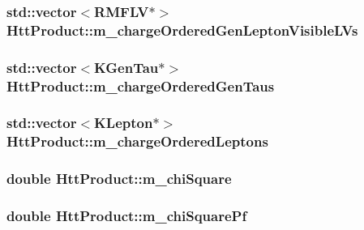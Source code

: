\label{classHttProduct_a70bf9c026bb6be12a25a0e793215511f}
\hypertarget{classHttProduct_a736650de11728388126970486f2f4417}{
\subsubsection[{m\_\-chargeOrderedGenLeptonVisibleLVs}]{\setlength{\rightskip}{0pt plus 5cm}std::vector$<$RMFLV$\ast$$>$ {\bf HttProduct::m\_\-chargeOrderedGenLeptonVisibleLVs}}}
\label{classHttProduct_a736650de11728388126970486f2f4417}
\hypertarget{classHttProduct_a7d32c5bc91b092a3a59af15a00ec6ec4}{
\subsubsection[{m\_\-chargeOrderedGenTaus}]{\setlength{\rightskip}{0pt plus 5cm}std::vector$<$KGenTau$\ast$$>$ {\bf HttProduct::m\_\-chargeOrderedGenTaus}}}
\label{classHttProduct_a7d32c5bc91b092a3a59af15a00ec6ec4}
\hypertarget{classHttProduct_ab6f4f492a592b34911ad317378b72f1b}{
\subsubsection[{m\_\-chargeOrderedLeptons}]{\setlength{\rightskip}{0pt plus 5cm}std::vector$<$KLepton$\ast$$>$ {\bf HttProduct::m\_\-chargeOrderedLeptons}}}
\label{classHttProduct_ab6f4f492a592b34911ad317378b72f1b}
\hypertarget{classHttProduct_a5cd0d8131990b751fa9c37148267a82f}{
\subsubsection[{m\_\-chiSquare}]{\setlength{\rightskip}{0pt plus 5cm}double {\bf HttProduct::m\_\-chiSquare}}}
\label{classHttProduct_a5cd0d8131990b751fa9c37148267a82f}
\hypertarget{classHttProduct_a662eecf0d76a57e4dc516b9acef7fb6a}{
\subsubsection[{m\_\-chiSquarePf}]{\setlength{\rightskip}{0pt plus 5cm}double {\bf HttProduct::m\_\-chiSquarePf}}}
